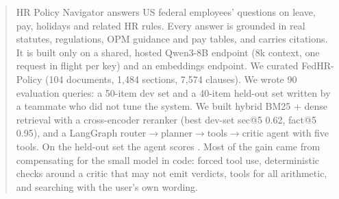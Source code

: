 \begin{abstract}
\noindent
HR Policy Navigator answers US federal employees' questions on leave, pay, holidays and related HR rules. Every
answer is grounded in real statutes, regulations, OPM guidance and pay tables, and carries citations. It is built
only on a shared, hosted Qwen3-8B endpoint (8k context, one request in flight per key) and an embeddings endpoint.
We curated FedHR-Policy (104 documents, 1,484 sections, 7,574 clauses). We wrote 90 evaluation queries: a 50-item
dev set and a 40-item held-out set written by a teammate who did not tune the system. We built hybrid BM25 + dense
retrieval with a cross-encoder reranker (best dev-set sec@5 0.62, fact@5 0.95), and a LangGraph
router$\to$planner$\to$tools$\to$critic agent with five tools. On the held-out set the agent scores
.
Most of the gain came from compensating for the small model in code: forced tool use, deterministic checks around a
critic that may not emit verdicts, tools for all arithmetic, and searching with the user's own wording.
\end{abstract}

